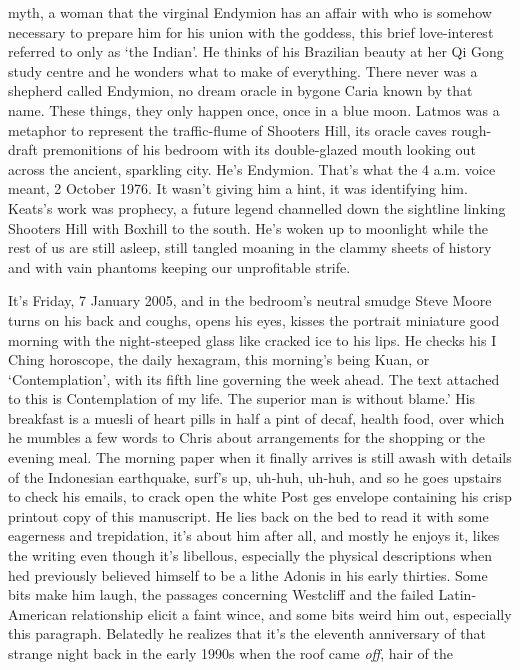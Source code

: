 \documentclass[
]{article}
\begin{document}
myth, a woman that the virginal Endymion has an affair with who is
somehow necessary to prepare him for his union with the goddess, this
brief love-interest referred to only as `the Indian'. He thinks of his
Brazilian beauty at her Qi Gong study centre and he wonders what to make
of everything. There never was a shepherd called Endymion, no dream
oracle in bygone Caria known by that name. These things, they only
happen once, once in a blue moon. Latmos was a metaphor to represent the
traffic-flume of Shooters Hill, its oracle caves rough-draft
premonitions of his bedroom with its double-glazed mouth looking out
across the ancient, sparkling city. He's Endymion. That's what the 4
a.m. voice meant, 2 October 1976. It wasn't giving him a hint, it was
identifying him. Keats's work was prophecy, a future legend channelled
down the sightline linking Shooters Hill with Boxhill to the south. He's
woken up to moonlight while the rest of us are still asleep, still
tangled moaning in the clammy sheets of history and with vain phantoms
keeping our unprofitable strife. \par
It's Friday, 7 January 2005, and in the bedroom's neutral smudge
Steve Moore turns on his back and coughs, opens his eyes, kisses the
portrait miniature good morning with the night-steeped glass like
cracked ice to his lips. He checks his I Ching horoscope, the daily
hexagram, this morning's being Kuan, or `Contemplation', with its fifth
line governing the week ahead. The text attached to this is
Contemplation of my life. The superior man is without blame.' His
breakfast is a muesli of heart pills in half a pint of decaf, health
food, over which he mumbles a few words to Chris about arrangements for
the shopping or the evening meal. The morning paper when it finally
arrives is still awash with details of the Indonesian earthquake, surf's
up, uh-huh, uh-huh, and so he goes upstairs to check his emails, to
crack open the white Post ges envelope containing his crisp printout
copy of this manuscript. He lies back on the bed to read it with some
eagerness and trepidation, it's about him after all, and mostly he
enjoys it, likes the writing even though it's libellous, especially the
physical descriptions when hed previously believed himself to be a lithe
Adonis in his early thirties. Some bits make him laugh, the passages
concerning Westcliff and the failed Latin-American relationship elicit a
faint wince, and some bits weird him out, especially this paragraph.
Belatedly he realizes that it's the eleventh anniversary of that strange
night back in the early 1990s when the roof came \emph{off}, hair of the
\end{document}
